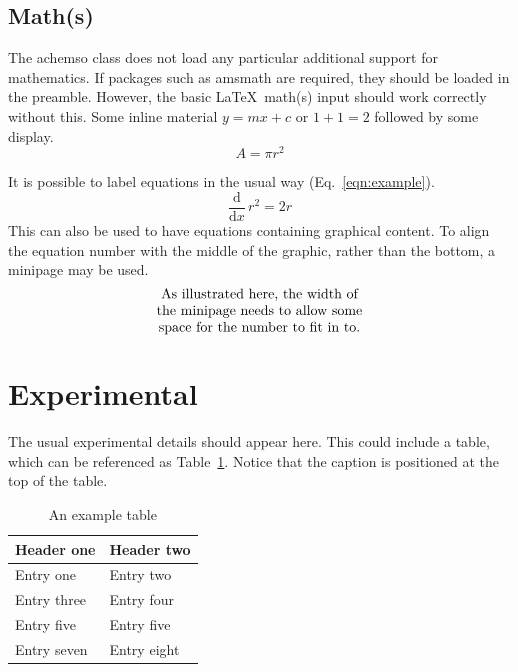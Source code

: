\documentclass[journal=jpca,manuscript=article]{achemso}
\begin{document}
\subsection{Math(s)}

The \textsf{achemso} class does not load any particular additional
support for mathematics.  If packages such as \textsf{amsmath} are
required, they should be loaded in the preamble.  However,
the basic \LaTeX\ math(s) input should work correctly without
this.  Some inline material \( y = mx + c \) or $ 1 + 1 = 2 $
followed by some display. \[ A = \pi r^2 \]

It is possible to label equations in the usual way (Eq.~\ref{eqn:example}).
\begin{equation}
  \frac{\mathrm{d}}{\mathrm{d}x} \, r^2 = 2r \label{eqn:example}
\end{equation}
This can also be used to have equations containing graphical
content. To align the equation number with the middle of the graphic,
rather than the bottom, a minipage may be used.
\begin{equation}
  \begin{minipage}[c]{0.80\linewidth}
    \centering
    As illustrated here, the width of \\
    the minipage needs to allow some  \\
    space for the number to fit in to.
  \end{minipage}
  \label{eqn:graphic}
\end{equation}

\section{Experimental}

The usual experimental details should appear here.  This could
include a table, which can be referenced as Table~\ref{tbl:example}.
Notice that the caption is positioned at the top of the table.
\begin{table}
  \caption{An example table}
  \label{tbl:example}
  \begin{tabular}{ll}
    \hline
    Header one  & Header two  \\
    \hline
    Entry one   & Entry two   \\
    Entry three & Entry four  \\
    Entry five  & Entry five  \\
    Entry seven & Entry eight \\
    \hline
  \end{tabular}
\end{table}
\end{document}
